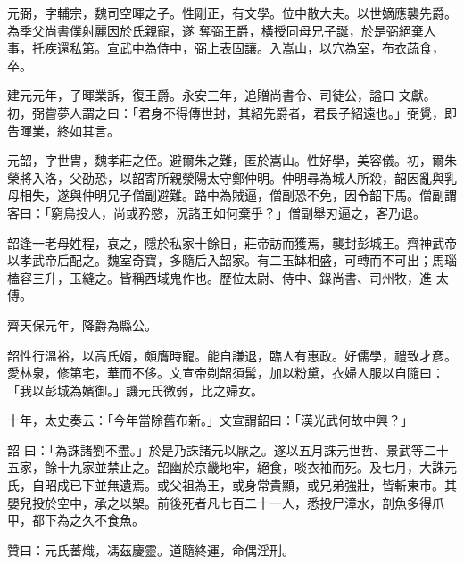 \begin{pinyinscope}
 元弼，字輔宗，魏司空暉之子。性剛正，有文學。位中散大夫。以世嫡應襲先爵。為季父尚書僕射麗因於氏親寵，遂
 奪弼王爵，橫授同母兄子誕，於是弼絕棄人事，托疾還私第。宣武中為侍中，弼上表固讓。入嵩山，以穴為室，布衣蔬食，卒。



 建元元年，子暉業訴，復王爵。永安三年，追贈尚書令、司徒公，謚曰
 文獻。初，弼嘗夢人謂之曰：「君身不得傳世封，其紹先爵者，君長子紹遠也。」弼覺，即告暉業，終如其言。



 元韶，字世胄，魏孝莊之侄。避爾朱之難，匿於嵩山。性好學，美容儀。初，爾朱榮將入洛，父劭恐，以韶寄所親滎陽太守鄭仲明。仲明尋為城人所殺，韶因亂與乳母相失，遂與仲明兄子僧副避難。路中為賊逼，僧副恐不免，因令韶下馬。僧副謂客曰：「窮鳥投人，尚或矜愍，況諸王如何棄乎？」僧副舉刃逼之，客乃退。



 韶逢一老母姓程，哀之，隱於私家十餘日，莊帝訪而獲焉，襲封彭城王。齊神武帝
 以孝武帝后配之。魏室奇寶，多隨后入韶家。有二玉缽相盛，可轉而不可出；馬瑙榼容三升，玉縫之。皆稱西域鬼作也。歷位太尉、侍中、錄尚書、司州牧，進
 太傅。



 齊天保元年，降爵為縣公。



 韶性行溫裕，以高氏婿，頗膺時寵。能自謙退，臨人有惠政。好儒學，禮致才彥。愛林泉，修第宅，華而不侈。文宣帝剃韶須髯，加以粉黛，衣婦人服以自隨曰：「我以彭城為嬪御。」譏元氏微弱，比之婦女。



 十年，太史奏云：「今年當除舊布新。」文宣謂韶曰：「漢光武何故中興？」



 韶
 曰：「為誅諸劉不盡。」於是乃誅諸元以厭之。遂以五月誅元世哲、景武等二十
 五家，餘十九家並禁止之。韶幽於京畿地牢，絕食，啖衣袖而死。及七月，大誅元氏，自昭成已下並無遺焉。或父祖為王，或身常貴顯，或兄弟強壯，皆斬東市。其嬰兒投於空中，承之以槊。前後死者凡七百二十一人，悉投尸漳水，剖魚多得爪甲，都下為之久不食魚。



 贊曰：元氏蕃熾，馮茲慶靈。道隨終運，命偶淫刑。



\end{pinyinscope}